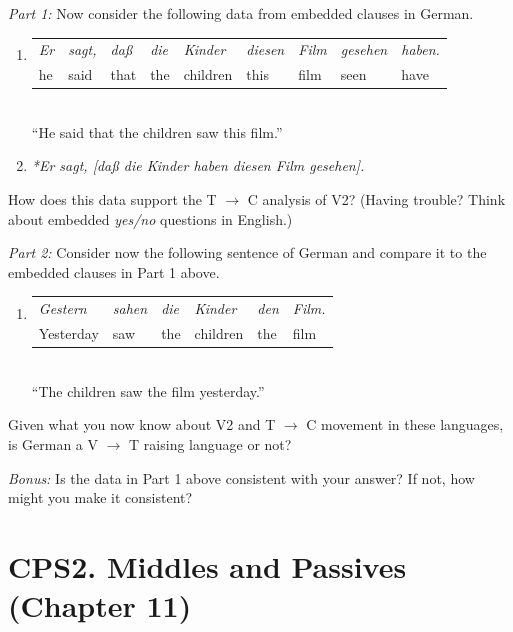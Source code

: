 ﻿\documentclass[11pt]{article}
\begin{document}
\newpage
\vspace{3em}
\textit{Part 1:} Now consider the following data from embedded clauses in German.

\begin{enumerate}
\item[(d)]
  \begin{tabular}[t]{@{}l@{\quad}l@{\quad}l@{\quad}l@{\quad}l@{\quad}l@{\quad}l@{\quad}l@{\quad}l@{}}
    \textit{Er} & \textit{sagt,} & \textit{daß} & \textit{die} & \textit{Kinder} & \textit{diesen} & \textit{Film} & \textit{gesehen} & \textit{haben.}\\
    he & said & that & the & children & this & film & seen & have
  \end{tabular}\\
  ``He said that the children saw this film.''
  \item[(e)] \textit{*Er sagt, [daß die Kinder haben diesen Film gesehen].}
\end{enumerate}

How does this data support the T $\rightarrow$ C analysis of V2? (Having trouble? Think about embedded \textit{yes/no} questions in English.)

\vspace{5em}
\textit{Part 2:} Consider now the following sentence of German and compare it to the embedded clauses in Part 1 above.

\begin{enumerate}
\item[(f)]
  \begin{tabular}[t]{@{}l@{\quad}l@{\quad}l@{\quad}l@{\quad}l@{\quad}l@{}}
    \textit{Gestern} & \textit{sahen} & \textit{die} & \textit{Kinder} & \textit{den} & \textit{Film.}\\
    Yesterday & saw & the & children & the & film
  \end{tabular}\\
  ``The children saw the film yesterday.''
\end{enumerate}

Given what you now know about V2 and T $\rightarrow$ C movement in these languages, is German a V $\rightarrow$ T raising language or not?

\vspace{5em}
\textit{Bonus:} Is the data in Part 1 above consistent with your answer? If not, how might you make it consistent?
\vspace{3em}
\newpage
\section*{CPS2. Middles and Passives (Chapter 11)}
\end{document}
